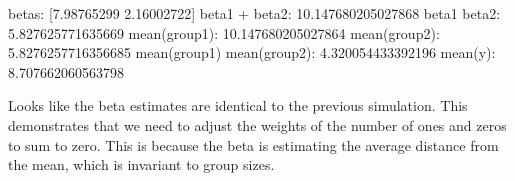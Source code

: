 \documentclass[letterpaper,10pt,english]{sphinxmanual}
\begin{document}
\begin{sphinxVerbatim}[commandchars=\\\{\}]
betas: [7.98765299 2.16002722]
beta1 + beta2: 10.147680205027868
beta1 \PYGZhy{} beta2: 5.827625771635669
mean(group1): 10.147680205027864
mean(group2): 5.8276257716356685
mean(group1) \PYGZhy{} mean(group2): 4.320054433392196
mean(y): 8.707662060563798
\end{sphinxVerbatim}

\noindent{}

Looks like the beta estimates are identical to the previous simulation. This demonstrates that we  need to adjust the weights of the number of ones and zeros to sum to zero.  This is because the beta is estimating the average distance from the mean, which is invariant to group sizes.
\end{document}
